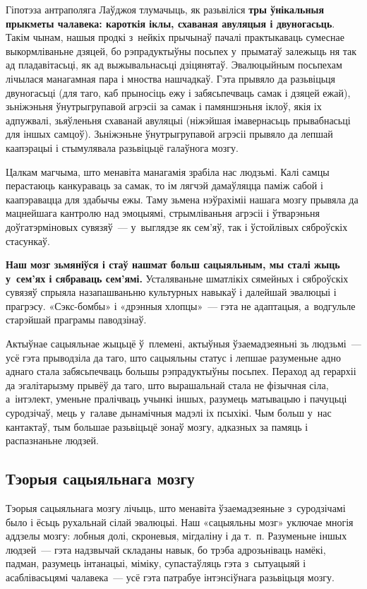 Гіпотэза антраполяга Лаўджоя тлумачыць, як разьвіліся \textbf{тры ўнікальныя прыкметы чалавека: кароткія іклы, схаваная авуляцыя і двуногасьць}. Такім чынам, нашыя продкі з~нейкіх прычынаў пачалі практыкаваць сумеснае выкормліваньне дзяцей, бо рэпрадуктыўны посьпех у~прыматаў залежыць ня так ад пладавітасьці, як ад выжывальнасьці дзіцянятаў. Эвалюцыйным посьпехам лічылася манагамная пара і мноства нашчадкаў. Гэта прывяло да разьвіцьця двуногасьці (для таго, каб прыносіць ежу і забясьпечваць самак і дзяцей ежай), зьніжэньня ўнутрыгрупавой агрэсіі за самак і памяншэньня іклоў, якія іх адпужвалі, зьяўленьня схаванай авуляцыі (ніжэйшая імавернасьць прывабнасьці для іншых самцоў). Зьніжэньне ўнутрыгрупавой агрэсіі прывяло да лепшай каапэрацыі і стымулявала разьвіцьцё галаўнога мозгу.

Цалкам магчыма, што менавіта манагамія зрабіла нас людзьмі. Калі самцы перастаюць канкураваць за самак, то ім лягчэй дамаўляцца паміж сабой і каапэравацца для здабычы ежы. Таму зьмена нэўрахіміі нашага мозгу прывяла да мацнейшага кантролю над эмоцыямі, стрымліваньня агрэсіі і ўтварэньня доўгатэрміновых сувязяў~--- у~выглядзе як сем'яў, так і ўстойлівых сяброўскіх стасункаў.

\textbf{Наш мозг зьмяніўся і стаў нашмат больш сацыяльным, мы сталі жыць у~сем'ях і сябраваць сем'ямі.} Усталяваньне шматлікіх сямейных і сяброўскіх сувязяў спрыяла назапашваньню культурных навыкаў і далейшай эвалюцыі і прагрэсу. «Сэкс-бомбы» і «дрэнныя хлопцы»~--- гэта не адаптацыя, а~водгульле старэйшай праграмы паводзінаў.

Актыўнае сацыяльнае жыцьцё ў~племені, актыўныя ўзаемадзеяньні зь людзьмі~--- усё гэта прыводзіла да таго, што сацыяльны статус і лепшае разуменьне адно аднаго стала забясьпечваць большы рэпрадуктыўны посьпех. Пераход ад герархіі да эгалітарызму прывёў да таго, што вырашальнай стала не фізычная сіла, а~інтэлект, уменьне пралічваць учынкі іншых, разумець матывацыю і пачуцьці суродзічаў, мець у~галаве дынамічныя мадэлі іх псыхікі. Чым больш у~нас кантактаў, тым большае разьвіцьцё зонаў мозгу, адказных за памяць і распазнаньне людзей.

\subsection*{Тэорыя сацыяльнага мозгу}

Тэорыя сацыяльнага мозгу лічыць, што менавіта ўзаемадзеяньне з~суродзічамі было і ёсьць рухальнай сілай эвалюцыі. Наш «сацыяльны мозг» уключае многія аддзелы мозгу: лобныя долі, скроневыя, мігдаліну і да т.~п. Разуменьне іншых людзей~--- гэта надзвычай складаны навык, бо трэба адрозьніваць намёкі, падман, разумець інтанацыі, міміку, супастаўляць гэта з~сытуацыяй і асаблівасьцямі чалавека~--- усё гэта патрабуе інтэнсіўнага разьвіцьця мозгу.

